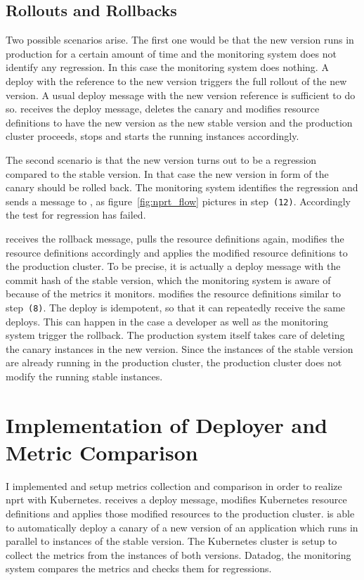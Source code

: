 \section{Rollouts and Rollbacks}

Two possible scenarios arise. The first one would be that the new version runs in
production for a certain amount of time and the monitoring system does not identify any
regression. In this case the monitoring system does nothing. A deploy with the reference
to the new version triggers the full rollout of the new version. A usual deploy message
with the new version reference is sufficient to do so. \deployer receives the deploy
message, deletes the canary and modifies resource definitions to have the new version as
the new stable version and the production cluster proceeds, stops and starts the running
instances accordingly.

The second scenario is that the new version turns out to be a regression compared to the
stable version. In that case the new version in form of the canary should be rolled
back. The monitoring system identifies the regression and sends a message to \deployer, as
figure~\ref{fig:nprt_flow} pictures in step~\texttt{(12)}. Accordingly the test for
regression has failed.

\deployer receives the rollback message, pulls the resource definitions again, modifies the
resource definitions accordingly and applies the modified resource definitions to the
production cluster. To be precise, it is actually a deploy message with the commit
hash of the stable version, which the monitoring system is aware of because of the metrics
it monitors. \deployer modifies the resource definitions similar to step~\texttt{(8)}. The
deploy is idempotent, so that \deployer it can repeatedly receive the same deploys. This
can happen in the case a developer as well as the monitoring system trigger the
rollback. The production system itself takes care of deleting the canary instances in the
new version. Since the instances of the stable version are already running in the
production cluster, the production cluster does not modify the running stable instances.

\chapter{Implementation of Deployer and Metric Comparison}
\label{chap:detail}

I implemented \deployer and setup metrics collection and comparison in order to realize
\gls{nprt} with Kubernetes. \deployer receives a deploy message, modifies Kubernetes
resource definitions and applies those modified resources to the production
cluster. \deployer is able to automatically deploy a canary of a new version of an
application which runs in parallel to instances of the stable version. The Kubernetes
cluster is setup to collect the metrics from the instances of both versions. Datadog, the
monitoring system compares the metrics and checks them for regressions.

